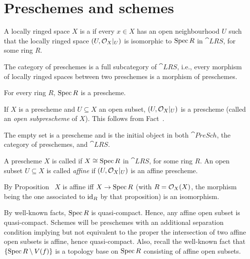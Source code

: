 \documentclass[a4paper,parskip=half,numbers=enddot, DIV=12]{scrreprt}
\begin{document}
\section{Preschemes and schemes}
\begin{defi} 
    A locally ringed space $X$ is a  if every $x\in X$ has an open neighbourhood $U$ such that the locally ringed space $(U,\mathcal{O}_X|_U)$ is isomorphic to $\operatorname{Spec} R$ in $\cat{LRS}$, for some ring $R$. 
    
    The category of preschemes is a full subcategory of $\cat{LRS}$, i.e., every morphism of locally ringed spaces between two preschemes is a morphism of preschemes.
\end{defi}
\begin{example}
    For every ring $R$, $\operatorname{Spec} R$ is a prescheme.
\end{example}
\begin{example}
    If $X$ is a prescheme and $U\subseteq X$ an open subset, $(U, \mathcal{O}_X|_U)$ is a prescheme (called an \emph{open subprescheme} of $X$). This follows from Fact~.
\end{example}
\begin{example*}
    The empty set is a prescheme and is the initial object in both $\cat{PreSch}$, the category of preschemes, and $\cat{LRS}$.
\end{example*}
\begin{defi}
    A prescheme $X$ is called  if $X\cong \operatorname{Spec} R$ in $\cat{LRS}$, for some ring $R$. An open subset $U\subseteq X$ is called \emph{affine} if $(U,\mathcal{O}_X|_U)$ is an affine prescheme.
\end{defi}
\begin{rem*}
    By Proposition~ $X$ is affine iff $X\morphism \Spec R$ (with $R=\mathcal{O}_X(X)$, the morphism being the one associated to $\operatorname{id}_R$ by that proposition) is an isomorphism. 
\end{rem*}
\begin{rem*}
    By well-known facts, $\operatorname{Spec} R$ is quasi-compact. Hence, any affine open subset is quasi-compact. Schemes will be preschemes with an additional separation condition implying but not equivalent to the proper the intersection of two affine open subsets is affine, hence quasi-compact. Also, recall the well-known fact that $\left\{\operatorname{Spec} R\setminus V(f)\right\}$ is a topology base on $\operatorname{Spec} R$ consisting of affine open subsets. 
\end{rem*}
\end{document}
